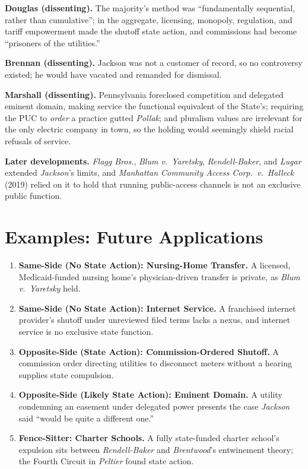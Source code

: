\documentclass[12pt]{article}
\begin{document}
\textbf{Douglas (dissenting).} The majority's method was ``fundamentally sequential, rather than cumulative''; in the aggregate, licensing, monopoly, regulation, and tariff empowerment made the shutoff state action, and commissions had become ``prisoners of the utilities.''

\textbf{Brennan (dissenting).} Jackson was not a customer of record, so no controversy existed; he would have vacated and remanded for dismissal.

\textbf{Marshall (dissenting).} Pennsylvania foreclosed competition and delegated eminent domain, making service the functional equivalent of the State's; requiring the PUC to \emph{order} a practice gutted \textit{Pollak}; and pluralism values are irrelevant for the only electric company in town, so the holding would seemingly shield racial refusals of service.

\textbf{Later developments.} \textit{Flagg Bros.}, \textit{Blum v.\ Yaretsky}, \textit{Rendell-Baker}, and \textit{Lugar} extended \textit{Jackson}'s limits, and \textit{Manhattan Community Access Corp.\ v.\ Halleck} (2019) relied on it to hold that running public-access channels is not an exclusive public function.

\section{Examples: Future Applications}

\begin{enumerate}
\item \textbf{Same-Side (No State Action): Nursing-Home Transfer.} A licensed, Medicaid-funded nursing home's physician-driven transfer is private, as \textit{Blum v.\ Yaretsky} held.
\item \textbf{Same-Side (No State Action): Internet Service.} A franchised internet provider's shutoff under unreviewed filed terms lacks a nexus, and internet service is no exclusive state function.
\item \textbf{Opposite-Side (State Action): Commission-Ordered Shutoff.} A commission order directing utilities to disconnect meters without a hearing supplies state compulsion.
\item \textbf{Opposite-Side (Likely State Action): Eminent Domain.} A utility condemning an easement under delegated power presents the case \textit{Jackson} said ``would be quite a different one.''
\item \textbf{Fence-Sitter: Charter Schools.} A fully state-funded charter school's expulsion sits between \textit{Rendell-Baker} and \textit{Brentwood}'s entwinement theory; the Fourth Circuit in \textit{Peltier} found state action.
\end{enumerate}
\end{document}
